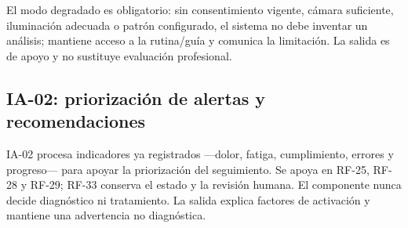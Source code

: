 \documentclass[12pt,a4paper]{article}
\begin{document}
El modo degradado es obligatorio: sin consentimiento vigente, cámara suficiente, iluminación adecuada o patrón configurado, el sistema no debe inventar un análisis; mantiene acceso a la rutina/guía y comunica la limitación. La salida es de apoyo y no sustituye evaluación profesional.

\subsection{IA-02: priorización de alertas y recomendaciones}
IA-02 procesa indicadores ya registrados —dolor, fatiga, cumplimiento, errores y progreso— para apoyar la priorización del seguimiento. Se apoya en RF-25, RF-28 y RF-29; RF-33 conserva el estado y la revisión humana. El componente nunca decide diagnóstico ni tratamiento. La salida explica factores de activación y mantiene una advertencia no diagnóstica.
\end{document}
